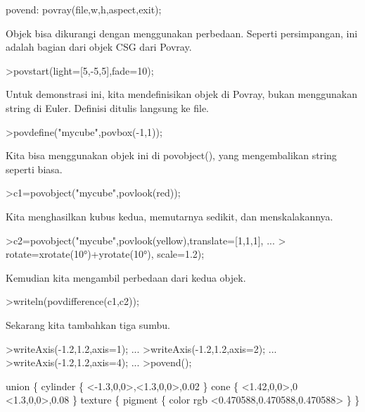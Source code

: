 \documentclass[a4paper,10pt]{article}
\begin{document}
\begin{eulernotebook}
\begin{eulercomment}
\begin{eulercomment}
\begin{euleroutput}
  povend:
      povray(file,w,h,aspect,exit); 
\end{euleroutput}
\begin{eulercomment}
Objek bisa dikurangi dengan menggunakan perbedaan. Seperti
persimpangan, ini adalah bagian dari objek CSG dari Povray.
\end{eulercomment}
\begin{eulerprompt}
>povstart(light=[5,-5,5],fade=10);
\end{eulerprompt}
\begin{eulercomment}
Untuk demonstrasi ini, kita mendefinisikan objek di Povray, bukan
menggunakan string di Euler. Definisi ditulis langsung ke file.
\end{eulercomment}
\begin{eulerprompt}
>povdefine("mycube",povbox(-1,1));
\end{eulerprompt}
\begin{eulercomment}
Kita bisa menggunakan objek ini di povobject(), yang mengembalikan
string seperti biasa.
\end{eulercomment}
\begin{eulerprompt}
>c1=povobject("mycube",povlook(red));
\end{eulerprompt}
\begin{eulercomment}
Kita menghasilkan kubus kedua, memutarnya sedikit, dan menskalakannya.
\end{eulercomment}
\begin{eulerprompt}
>c2=povobject("mycube",povlook(yellow),translate=[1,1,1], ...
>  rotate=xrotate(10°)+yrotate(10°), scale=1.2);
\end{eulerprompt}
\begin{eulercomment}
Kemudian kita mengambil perbedaan dari kedua objek.
\end{eulercomment}
\begin{eulerprompt}
>writeln(povdifference(c1,c2));
\end{eulerprompt}
\begin{eulercomment}
Sekarang kita tambahkan tiga sumbu.
\end{eulercomment}
\begin{eulerprompt}
>writeAxis(-1.2,1.2,axis=1); ...
>writeAxis(-1.2,1.2,axis=2); ...
>writeAxis(-1.2,1.2,axis=4); ...
>povend();
\end{eulerprompt}
\begin{euleroutput}
  union \{
    cylinder \{ <-1.3,0,0>,<1.3,0,0>,0.02 \}
    cone \{ 
      <1.42,0,0>,0
      <1.3,0,0>,0.08
    \}
    texture \{ pigment \{ color rgb <0.470588,0.470588,0.470588> \} \}

\end{euleroutput}
\end{eulercomment}
\end{eulercomment}
\end{eulernotebook}
\end{document}
